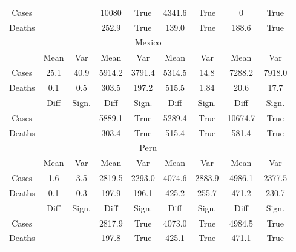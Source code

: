 \documentclass{article}
\begin{document}
\begin{table}[]
\begin{tabular}{ccccccccc}
Cases  &              &                 & 10080          & True              & 4341.6    & True           & 0              & True              \\
Deaths &              &                 & 252.9          & True              & 139.0     & True           & 188.6          & True              \\ \hline
\multicolumn{9}{c}{Mexico}                                                                                                                     \\ \hline
       & Mean         & Var        & Mean           & Var          & Mean      & Var       & Mean           & Var          \\ \hline
Cases  & 25.1         & 40.9            & 5914.2         & 3791.4            & 5314.5    & 14.8           & 7288.2         & 7918.0            \\
Deaths & 0.1          & 0.5             & 303.5          & 197.2             & 515.5     & 1.84           & 20.6           & 17.7              \\ \hline
       & Diff         & Sign.           & Diff           & Sign.       & Diff      & Sign.    & Diff           & Sign.       \\ \hline
Cases  &              &                 & 5889.1         & True              & 5289.4    & True           & 10674.7        & True              \\
Deaths &              &                 & 303.4          & True              & 515.4     & True           & 581.4          & True              \\ \hline
\multicolumn{9}{c}{Peru}                                                                                                                       \\ \hline
       & Mean         & Var        & Mean           & Var          & Mean      & Var       & Mean           & Var          \\ \hline
Cases  & 1.6          & 3.5             & 2819.5         & 2293.0            & 4074.6    & 2883.9         & 4986.1         & 2377.5            \\
Deaths & 0.1          & 0.3             & 197.9          & 196.1             & 425.2     & 255.7          & 471.2          & 230.7             \\ \hline
       & Diff         & Sign.           & Diff           & Sign.       & Diff      & Sign.    & Diff           & Sign.       \\ \hline
Cases  &              &                 & 2817.9         & True              & 4073.0    & True           & 4984.5         & True              \\
Deaths &              &                 & 197.8          & True              & 425.1     & True           & 471.1          & True              \\ \hline
\end{tabular}

\label{Tab:cases2}
\end{table}
\end{document}
